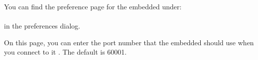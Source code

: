 \label{TasksPrefsEmbeddedAgent}

You can find the preference page for the embedded \gdagent{} under:\\
\\
in the preferences dialog.

On this page, you can enter the port number that the embedded \gdagent{}  should use when you connect to it . The default is 60001.


